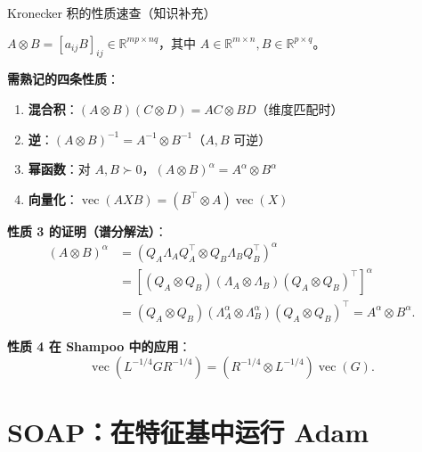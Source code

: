 \documentclass[aspectratio=169,10pt]{ctexbeamer}
\newcommand{\R}{\mathbb{R}}
\newcommand{\vect}{\operatorname{vec}}
\begin{document}
\begin{frame}{Kronecker 积的性质速查（知识补充）}
\begin{definition}[Kronecker 积]
  $A\otimes B = [a_{ij}B]_{ij}\in\R^{mp\times nq}$，其中 $A\in\R^{m\times n},B\in\R^{p\times q}$。
\end{definition}

\vspace{0.15cm}
\textbf{需熟记的四条性质}：
\begin{enumerate}
  \item \textbf{混合积}：$(A\otimes B)(C\otimes D) = AC\otimes BD$（维度匹配时）
  \item \textbf{逆}：$(A\otimes B)^{-1}=A^{-1}\otimes B^{-1}$（$A,B$ 可逆）
  \item \textbf{幂函数}：对 $A,B\succ0$，$(A\otimes B)^\alpha = A^\alpha\otimes B^\alpha$
  \item \textbf{向量化}：$\vect(AXB) = (B^\top\otimes A)\vect(X)$
\end{enumerate}

\vspace{0.15cm}
\textbf{性质 3 的证明（谱分解法）}：
\[
  \begin{aligned}
    (A\otimes B)^\alpha &= (Q_A\Lambda_A Q_A^\top \otimes Q_B\Lambda_B Q_B^\top)^\alpha\\
    &= [(Q_A\otimes Q_B)(\Lambda_A\otimes\Lambda_B)(Q_A\otimes Q_B)^\top]^\alpha\\
    &= (Q_A\otimes Q_B)(\Lambda_A^\alpha\otimes\Lambda_B^\alpha)(Q_A\otimes Q_B)^\top
    = A^\alpha\otimes B^\alpha.
  \end{aligned}
\]

\vspace{0.15cm}
\textbf{性质 4 在 Shampoo 中的应用}：
\[
  \vect(L^{-1/4}GR^{-1/4}) = (R^{-1/4}\otimes L^{-1/4})\vect(G).
\]
\end{frame}

\section{SOAP：在特征基中运行 Adam}
\end{document}
